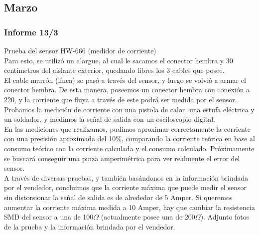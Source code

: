 \subsection{Marzo}
\subsubsection{Informe 13/3}
Prueba del sensor HW-666 (medidor de corriente)\\

          	Para esto, se utilizó un alargue, al cual le sacamos el conector hembra y 30 centímetros del aislante exterior, quedando libres los 3 cables que posee.\\
          	El cable marrón (línea) se pasó a través del sensor, y luego se volvió a armar el conector hembra. De esta manera, poseemos un conector hembra con conexión a 220, y la corriente que fluya a través de este podrá ser medida por el sensor.\\
           
          	Probamos la medición de corriente con una pistola de calor, una estufa eléctrica y un soldador, y medimos la señal de salida con un osciloscopio digital.\\
           
          	En las mediciones que realizamos, pudimos aproximar correctamente la corriente con una precisión aproximada del 10\%, comparando la corriente teórica en base al consumo teórico con la corriente calculada y el consumo calculado. Próximamente se buscará conseguir una pinza amperimétrica para ver realmente el error del sensor.\\
           
          	A través de diversas pruebas, y también basándonos en la información brindada por el vendedor, concluimos que la corriente máxima que puede medir el sensor sin distorsionar la señal de salida es de alrededor de 5 Amper. Si queremos aumentar la corriente máxima medida a 10 Amper, hay que cambiar la resistencia SMD del sensor a una de 100$\Omega$ (actualmente posee una de $200\Omega$). Adjunto fotos de la prueba y la información brindada por el vendedor.\\
 
